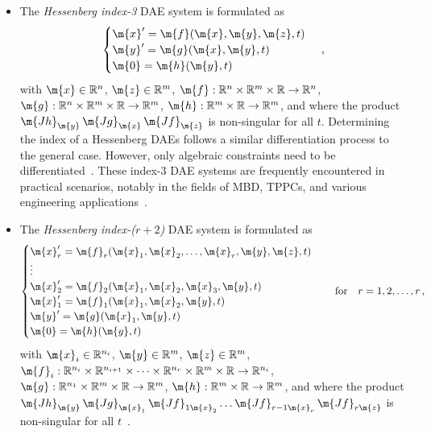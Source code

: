 \begin{itemize}
  \item The \emph{Hessenberg index-3} \ac{DAE} system is formulated as
  \begin{equation*}
    \begin{cases}
      \m{x}^\prime = \m{f}(\m{x}, \m{y}, \m{z}, t) \\
      \m{y}^\prime = \m{g}(\m{x}, \m{y}, t) \\
      \m{0}        = \m{h}(\m{y}, t)
    \end{cases} \, \text{,}
  \end{equation*}
  with $\m{x} \in \mathbb{R}^n$, $\m{z} \in \mathbb{R}^m$, $\m{f}: \mathbb{R}^{n} \times \mathbb{R}^{m} \times \mathbb{R} \rightarrow \mathbb{R}^{n}$, $\m{g}: \mathbb{R}^{n} \times \mathbb{R}^{m} \times \mathbb{R} \rightarrow \mathbb{R}^{m}$, $\m{h}: \mathbb{R}^{m} \times \mathbb{R} \rightarrow \mathbb{R}^{m}$, and where the product $\m{Jh}_{\m{y}} \, \m{Jg}_{\m{x}} \, \m{Jf}_{\m{z}}$ is non-singular for all $t$. Determining the index of a Hessenberg \acp{DAE} follows a similar differentiation process to the general case. However, only algebraic constraints need to be differentiated~\cite{ascher1991projected}. These index-3 \ac{DAE} systems are frequently encountered in practical scenarios, notably in the fields of \ac{MBD}, \acp{TPPC}, and various engineering applications~\cite{ascher1998computer,brenan1995numerical}.
  \item The \emph{Hessenberg index-($r+2$)} \ac{DAE} system is formulated as
  \begin{equation*}
    \begin{cases}
      \m{x}_r^\prime = \m{f}_r(\m{x}_1, \m{x}_2, \dots, \m{x}_r, \m{y}, \m{z}, t) \\
      \vdots \\
      \m{x}_2^\prime = \m{f}_2(\m{x}_1, \m{x}_2, \m{x}_3, \m{y}, t) \\
      \m{x}_1^\prime = \m{f}_1(\m{x}_1, \m{x}_2, \m{y}, t) \\
      \m{y}^\prime = \m{g}(\m{x}_1, \m{y}, t) \\
      \m{0}        = \m{h}(\m{y}, t)
    \end{cases} \quad \text{for} \quad r = 1, 2, \dots, r \, \text{,}
  \end{equation*}
  with $\m{x}_i \in \mathbb{R}^{n_i}$, $\m{y} \in \mathbb{R}^m$, $\m{z} \in \mathbb{R}^m$, $\m{f}_i: \mathbb{R}^{n_i} \times \mathbb{R}^{n_{i+1}} \times \dots \times \mathbb{R}^{n_r} \times \mathbb{R}^{m} \times \mathbb{R} \rightarrow \mathbb{R}^{n_i}$, $\m{g}: \mathbb{R}^{n_1} \times \mathbb{R}^{m} \times \mathbb{R} \rightarrow \mathbb{R}^{m}$, $\m{h}: \mathbb{R}^{m} \times \mathbb{R} \rightarrow \mathbb{R}^{m}$, and where the product $\m{Jh}_{\m{y}} \, \m{Jg}_{\m{x}_1} \, \m{Jf}_{1\m{x}_2} \dots \m{Jf}_{r-1\m{x}_r} \, \m{Jf}_{r\m{z}}$ is non-singular for all $t$~\cite[Section 3.5]{lamour2013differential}.
\end{itemize}

